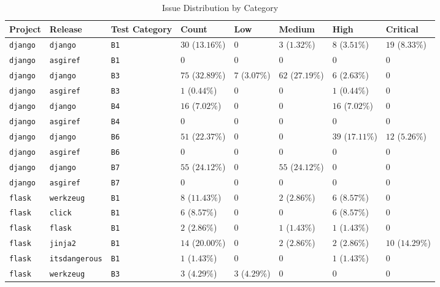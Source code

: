 \begin{table}
\caption{Issue Distribution by Category}
\label{tab:issue-category-distribution}
\begin{tabular}{llllllll}
\toprule
Project & Release & Test Category & Count & Low & Medium & High & Critical \\
\midrule
\texttt{django} & \texttt{django} & \texttt{B1} & $30$ ($13.16\%$) & $0$ & $3$ ($1.32\%$) & $8$ ($3.51\%$) & $19$ ($8.33\%$) \\
\texttt{django} & \texttt{asgiref} & \texttt{B1} & $0$ & $0$ & $0$ & $0$ & $0$ \\
\texttt{django} & \texttt{django} & \texttt{B3} & $75$ ($32.89\%$) & $7$ ($3.07\%$) & $62$ ($27.19\%$) & $6$ ($2.63\%$) & $0$ \\
\texttt{django} & \texttt{asgiref} & \texttt{B3} & $1$ ($0.44\%$) & $0$ & $0$ & $1$ ($0.44\%$) & $0$ \\
\texttt{django} & \texttt{django} & \texttt{B4} & $16$ ($7.02\%$) & $0$ & $0$ & $16$ ($7.02\%$) & $0$ \\
\texttt{django} & \texttt{asgiref} & \texttt{B4} & $0$ & $0$ & $0$ & $0$ & $0$ \\
\texttt{django} & \texttt{django} & \texttt{B6} & $51$ ($22.37\%$) & $0$ & $0$ & $39$ ($17.11\%$) & $12$ ($5.26\%$) \\
\texttt{django} & \texttt{asgiref} & \texttt{B6} & $0$ & $0$ & $0$ & $0$ & $0$ \\
\texttt{django} & \texttt{django} & \texttt{B7} & $55$ ($24.12\%$) & $0$ & $55$ ($24.12\%$) & $0$ & $0$ \\
\texttt{django} & \texttt{asgiref} & \texttt{B7} & $0$ & $0$ & $0$ & $0$ & $0$ \\
\texttt{flask} & \texttt{werkzeug} & \texttt{B1} & $8$ ($11.43\%$) & $0$ & $2$ ($2.86\%$) & $6$ ($8.57\%$) & $0$ \\
\texttt{flask} & \texttt{click} & \texttt{B1} & $6$ ($8.57\%$) & $0$ & $0$ & $6$ ($8.57\%$) & $0$ \\
\texttt{flask} & \texttt{flask} & \texttt{B1} & $2$ ($2.86\%$) & $0$ & $1$ ($1.43\%$) & $1$ ($1.43\%$) & $0$ \\
\texttt{flask} & \texttt{jinja2} & \texttt{B1} & $14$ ($20.00\%$) & $0$ & $2$ ($2.86\%$) & $2$ ($2.86\%$) & $10$ ($14.29\%$) \\
\texttt{flask} & \texttt{itsdangerous} & \texttt{B1} & $1$ ($1.43\%$) & $0$ & $0$ & $1$ ($1.43\%$) & $0$ \\
\texttt{flask} & \texttt{werkzeug} & \texttt{B3} & $3$ ($4.29\%$) & $3$ ($4.29\%$) & $0$ & $0$ & $0$ \\

\end{tabular}
\end{table}
